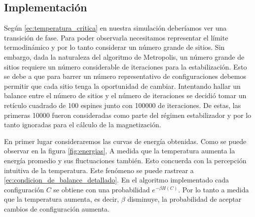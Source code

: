 \documentclass{article}
\begin{document}
\subsection{Implementación}

Según \eqref{ec:temperatura_critica} en nuestra simulación deberíamos ver una transición de fase. Para poder observarla necesitamos representar el límite termodinámico y por lo tanto considerar un número grande de sitios. Sin embargo, dada la naturaleza del algoritmo de Metropolis, un número grande de sitios requiere un número considerable de iteraciones para la estabilización. Esto se debe a que para barrer un número representativo de configuraciones debemos permitir que cada sitio tenga la oportunidad de cambiar. Intentando hallar un balance entre el número de sitios y el número de iteraciones se decidió tomar un retículo cuadrado de 100 espines junto con 100000 de iteraciones. De estas, las primeras 10000 fueron consideradas como parte del régimen estabilizador y por lo tanto ignoradas para el cálculo de la magnetización.

En primer lugar consideraremos las curvas de energía obtenidas. Como se puede observar en la figura \ref{fig:energias}, A medida que la temperatura aumenta la energía promedio y sus fluctuaciones también. Esto concuerda con la percepción intuitiva de la temperatura. Este fenómeno se puede rastrear a \eqref{ec:condicion_de_balance_detallado}. En el algoritmo implementado cada configuración $C$ se obtiene con una probabilidad $e^{-\beta H(C)}$. Por lo tanto a medida que la temperatura aumenta, es decir, $\beta$ disminuye, la probabilidad de aceptar cambios de configuración aumenta.
\end{document}
